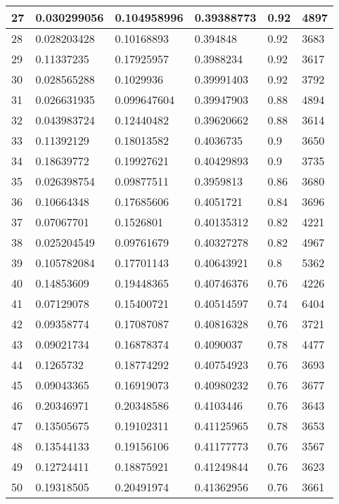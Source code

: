 \begin{longtable}{|l|l|l|l|l|l|}
27 & 0.030299056 & 0.104958996 & 0.39388773 & 0.92 & 4897 \\ \hline 
28 & 0.028203428 & 0.10168893 & 0.394848 & 0.92 & 3683 \\ \hline 
29 & 0.11337235 & 0.17925957 & 0.3988234 & 0.92 & 3617 \\ \hline 
30 & 0.028565288 & 0.1029936 & 0.39991403 & 0.92 & 3792 \\ \hline 
31 & 0.026631935 & 0.099647604 & 0.39947903 & 0.88 & 4894 \\ \hline 
32 & 0.043983724 & 0.12440482 & 0.39620662 & 0.88 & 3614 \\ \hline 
33 & 0.11392129 & 0.18013582 & 0.4036735 & 0.9 & 3650 \\ \hline 
34 & 0.18639772 & 0.19927621 & 0.40429893 & 0.9 & 3735 \\ \hline 
35 & 0.026398754 & 0.09877511 & 0.3959813 & 0.86 & 3680 \\ \hline 
36 & 0.10664348 & 0.17685606 & 0.4051721 & 0.84 & 3696 \\ \hline 
37 & 0.07067701 & 0.1526801 & 0.40135312 & 0.82 & 4221 \\ \hline 
38 & 0.025204549 & 0.09761679 & 0.40327278 & 0.82 & 4967 \\ \hline 
39 & 0.105782084 & 0.17701143 & 0.40643921 & 0.8 & 5362 \\ \hline 
40 & 0.14853609 & 0.19448365 & 0.40746376 & 0.76 & 4226 \\ \hline 
41 & 0.07129078 & 0.15400721 & 0.40514597 & 0.74 & 6404 \\ \hline 
42 & 0.09358774 & 0.17087087 & 0.40816328 & 0.76 & 3721 \\ \hline 
43 & 0.09021734 & 0.16878374 & 0.4090037 & 0.78 & 4477 \\ \hline 
44 & 0.1265732 & 0.18774292 & 0.40754923 & 0.76 & 3693 \\ \hline 
45 & 0.09043365 & 0.16919073 & 0.40980232 & 0.76 & 3677 \\ \hline 
46 & 0.20346971 & 0.20348586 & 0.4103446 & 0.76 & 3643 \\ \hline 
47 & 0.13505675 & 0.19102311 & 0.41125965 & 0.78 & 3653 \\ \hline 
48 & 0.13544133 & 0.19156106 & 0.41177773 & 0.76 & 3567 \\ \hline 
49 & 0.12724411 & 0.18875921 & 0.41249844 & 0.76 & 3623 \\ \hline 
50 & 0.19318505 & 0.20491974 & 0.41362956 & 0.76 & 3661 \\ \hline 
\end{longtable}